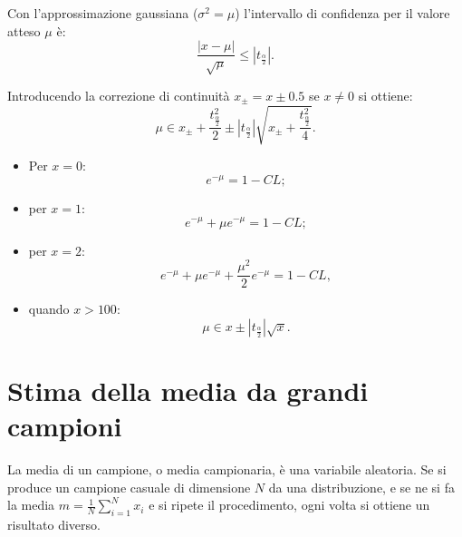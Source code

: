 Con l'approssimazione gaussiana ($\sigma^2=\mu$) l'intervallo di confidenza per il valore atteso $\mu$ è:
\begin{equation}
\label{eq:intervalli-eventi-poisson-gauss}
\frac { \left| x-\mu  \right|  }{ \sqrt { \mu  }  } \le \left| { t }_{ \frac { \alpha  }{ 2 }  } \right| .
\end{equation}

Introducendo la correzione di continuità $x_\pm=x\pm 0.5$ se $x\neq 0$ si ottiene:
\begin{equation}
\mu \in x_{ \pm  }+\frac { { t }^{ 2 }_{ \frac { \alpha  }{ 2 }  } }{ 2 } \pm \left| { t }_{ \frac { \alpha  }{ 2 }  } \right| \sqrt { x_{ \pm  }+\frac { { t }^{ 2 }_{ \frac { \alpha  }{ 2 }  } }{ 4 }  } .
\end{equation}
\begin{itemize}
\item Per $x=0$:
\begin{equation}
{ e }^{ -\mu  }=1-CL;
\end{equation}
\item per $x=1$:
\begin{equation}
{ e }^{ -\mu  }+\mu { e }^{ -\mu  }=1-CL;
\end{equation}
\item per $x=2$:
\begin{equation}
{ e }^{ -\mu  }+\mu { e }^{ -\mu  }+\frac { { \mu  }^{ 2 } }{ 2 } { e }^{ -\mu  }=1-CL,
\end{equation}
\item quando $x>100$:
\begin{equation}
\mu \in x\pm \left| { t }_{ \frac { \alpha  }{ 2 }  } \right| \sqrt { x }.
\end{equation}
\end{itemize}

\section{Stima della media da grandi campioni} %
\label{sec:stima-media-grandi}
La media di un campione, o media campionaria, è una variabile aleatoria. Se si produce un campione casuale di dimensione $N$ da una distribuzione, e se ne si fa la media $m=\frac { 1 }{ N } \sum _{ i=1 }^{ N }{ { x }_{ i } } $ e si ripete il procedimento, ogni volta si ottiene un risultato diverso.

